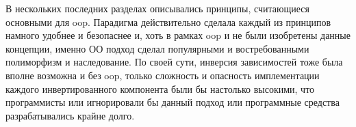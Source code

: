 
В нескольких последних разделах описывались принципы, считающиеся основными для \gls{oop}. Парадигма действительно сделала каждый из принципов намного удобнее и безопаснее и, хоть в рамках \gls{oop} и не были изобретены данные концепции, именно ОО подход сделал популярными и востребованными полиморфизм и наследование. По своей сути, инверсия зависимостей тоже была вполне возможна и без \gls{oop}, только сложность и опасность имплементации каждого инвертированного компонента были бы настолько высокими, что программисты или игнорировали бы данный подход или программные средства разрабатывались крайне долго.